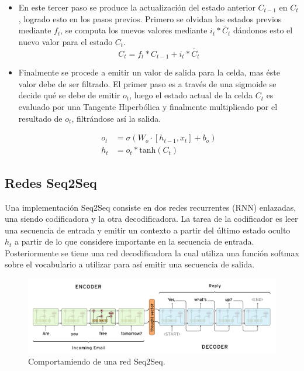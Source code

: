 \documentclass[12pt, letterpaper]{article}
\begin{document}
\begin{itemize}
            \item En este tercer paso se produce la actualización del estado anterior $C_{t-1}$ en $C_t$, logrado esto en los pasos previos. Primero se olvidan los estados previos mediante $f_t$, se computa los nuevos valores mediante $i_t*\tilde{C_t}$ dándonos esto el nuevo valor para el estado $C_t$. 
            \begin{equation}
                    C_t = f_t* C_{t-1} + i_t*\tilde{C_t}
            \end{equation}

            \item Finalmente se procede a emitir un valor de salida para la celda, mas éste valor debe de ser filtrado. El primer paso es a través de una sigmoide se decide qué se debe de emitir $o_t$, luego el estado actual de la celda $C_t$ es evaluado por una Tangente Hiperbólica y finalmente multiplicado por el resultado de $o_t$, filtrándose así la salida\cite{Understanding_LSTM}.

            \begin{equation}
                \begin{aligned}
                    o_t &= \sigma(W_o\cdot{[h_{t-1}, x_t]} + b_o) \\
                    h_t &=  o_t*\text{tanh}(C_t)
                \end{aligned}
            \end{equation}
        \end{itemize}

    \subsection{Redes Seq2Seq}
    Una implementación Seq2Seq consiste en dos redes recurrentes (RNN) enlazadas, una siendo codificadora y la otra decodificadora. La tarea de la codificador es leer una secuencia de entrada y emitir un contexto a partir del último estado oculto $h_t$ a partir de lo que considere importante en la secuencia de entrada. Posteriormente se tiene una red decodificadora la cual utiliza una función softmax sobre el vocabulario a utilizar para así emitir una secuencia de salida\cite{Ramamoorthy}\cite{Ramamoorthy2}.

    \begin{figure}[H]
        \centering
        \includegraphics[width=\linewidth]{img/Seq2Seq.png}
        \caption{Comportamiendo de una red Seq2Seq.}
    \end{figure}
\end{document}

